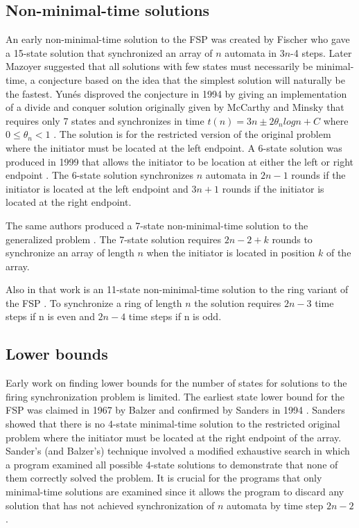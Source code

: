\documentclass{article}
\begin{document}
\subsection{Non-minimal-time solutions}
An early non-minimal-time solution to the FSP was created by Fischer who gave a 15-state solution that synchronized an array of $n$ automata in 3$n$-4 steps\cite{Fischer:1965:GPO:321281.321290}. Later
Mazoyer suggested that all solutions with few states must necessarily be minimal-time, a conjecture based on the idea that the simplest solution will naturally be the fastest. Yun\'{e}s disproved the conjecture in 1994 by giving an implementation of a divide and conquer solution originally given by McCarthy and Minsky \cite{MM1972} that requires only 7 states and synchronizes in time $t(n) = 3n \pm 2 \theta_{n}logn+C$ where $0 \leq \theta_{n} < 1$ \cite{Yunes1994}. The solution is for the restricted version of the original problem where the initiator must be located at the left endpoint. A 6-state solution was produced in 1999 that allows the initiator to be location at either the left or right endpoint \cite{settle1999new}. The 6-state solution synchronizes $n$ automata in $2n - 1$ rounds if the initiator is located at the left endpoint and $3n+1$ rounds if the initiator is located at the right endpoint.

The same authors produced a 7-state non-minimal-time solution to the generalized problem \cite {settle1999new}. The 7-state solution requires $2n-2+k$ rounds to synchronize an array of length $n$ when the initiator is located in position $k$ of the array.

Also in that work is an 11-state non-minimal-time solution to the ring variant of the FSP \cite{settle1999new}. To synchronize a ring of length $n$ the solution requires $2n-3$ time steps if n is even and $2n-4$ time steps if n is odd.

\subsection{Lower bounds}
Early work on finding lower bounds for the number of states for solutions to the firing synchronization problem is limited. The earliest state lower bound for the FSP was claimed in 1967 by Balzer \cite{Balzer1967} and confirmed by Sanders in 1994 \cite{Sanders1994}. Sanders showed that there is no 4-state minimal-time solution to the restricted original problem where the initiator must be located at the right endpoint of the array. Sander's (and Balzer's) technique involved a modified exhaustive search in which a program examined all possible 4-state solutions to demonstrate that none of them correctly solved the problem. It is crucial for the programs that only minimal-time solutions are examined since it allows the program to discard any solution that has not achieved synchronization of $n$ automata by time step $2n-2$.
\end{document}
